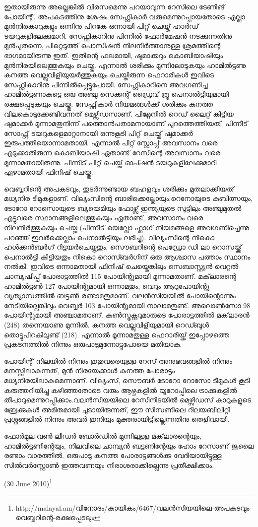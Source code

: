 ഇതായിരുന്നു അല്ലെങ്കില്‍ വിരസമെന്നു പറയാവുന്ന റേസിലെ ടേണിങ് പോയിന്റ്. അപകടത്തിനു ശേഷം സേഫ്റ്റികാര്‍ 
വരുമെന്നുറപ്പായതോടെ എല്ലാ മുന്‍നിരകാറുകളും ഒന്നിനു പിറകേ ഒന്നായി പിറ്റ് ചെയ്ത് ഹാര്‍ഡ് ടയറുകളിലേക്കുമാറി. 
സേഫ്റ്റികാറിനു പിന്നില്‍ ഫോര്‍മേഷന്‍ നടക്കുന്നതിനു മുന്‍പുതന്നെ, പിറ്റെടുത്ത് പൊസിഷന്‍ നിലനിര്‍ത്താനുള്ള 
ശ്രമത്തിന്റെ ഭാഗമായിരുന്നു ഇത്. ഇതിന്റെ ഫലമായി, ഷുമാക്കറും കൊബിയാഷിയും മുന്‍നിരയിലെത്തുകയും ചെയ്തു. 
എന്നാല്‍ ശരിക്കും മുന്നിലോടുകയും ഹാമില്‍ട്ടണു കനത്ത വെല്ലുവിളിയുയര്‍ത്തുകയും ചെയ്തിരുന്ന ഫെറാരികള്‍ ഇവിടെ 
സേഫ്റ്റികാറിനു പിന്നില്‍പ്പെട്ടുപോയി. സേഫ്റ്റികാറിനെ അവഗണിച്ച ഹാമില്‍ട്ടണാകട്ടെ ഒരു അഞ്ചു സെക്കന്റ് ഡ്രൈവ് ത്രൂ 
പെനാല്‍ട്ടിയുമായി രക്ഷപ്പെടുകയും ചെയ്തു. സേഫ്റ്റികാര്‍ നിയമങ്ങള്‍ക്ക് ശരിക്കും കനത്ത വിലകൊടുക്കേണ്ടിവന്നത് 
മെഴ്സിഡസാണ്. പിറ്റ്ലേനില്‍ റെഡ് ലൈറ്റ് കിട്ടിയ ഷുമാക്കര്‍ മൂന്നാമതുനിന്ന് പത്തൊന്‍പതാമനായാണ് പുറത്തെത്തിയത്. 
പിന്നീട് സോഫ്റ്റ് ടയറുകളെമാറ്റാനായി ഒന്നുകൂടി പിറ്റ് ചെയ്ത് ഷുമാക്കര്‍ ഇരുപത്തിയൊന്നാമതായി. എന്നാല്‍ പിറ്റ് 
സ്റ്റോപ്പ് അവസാനം വരെ എടുക്കാതിരുന്ന കൊബിയാഷി ഏതാണ്ട് റേസിന്റെ അവസാനം വരെ മൂന്നാമതായിരുന്നു. 
പിന്നീട് പിറ്റ് ചെയ്ത് ഓപ്ഷന്‍ ടയറുകളിലേക്കുമാറി ഏഴാമതായി ഫിനിഷ് ചെയ്തു.

വെബ്ബറിന്റെ അപകടവും, തുടര്‍ന്നുണ്ടായ ബഹളവും ശരിക്കും മുതലാക്കിയത് മധ്യനിര ടീമുകളാണ്. വില്യംസിന്റെ 
ബാരിക്കെല്ലോയും,റെനോയുടെ കുബിത്സയും, ടോറോ റോസൊയുടെ ബ്യയെമിയും ഫോഴ്സ് ഇന്ത്യയുടെ സുട്ടിലും 
അഞ്ചുമുതല്‍ എട്ടുവരെ സ്ഥാനങ്ങളിലെത്തുകയും ഏതാണ്ട്, അവസാനം വരെ നിലനിര്‍ത്തുകയും ചെയ്തു (പിന്നീട് 
യെല്ലോ ഫ്ലാഗ് നിയമങ്ങളെ അവഗണിച്ചെന്നു പറഞ്ഞ് ഇവര്‍ക്കെല്ലാം പെനാല്‍ട്ടിയും ലഭിച്ചു). വില്യംസിന്റെ നികൊ 
ഹള്‍ക്കന്‍ബര്‍ഗ് റിട്ടയര്‍ചെയ്തതും, സൌബറിന്റെ പെഡ്രോ ഡി ലാ റൊസയ്ക്ക് പെനാല്‍ട്ടി കിട്ടിയതും നികൊ 
റൊസ്ബര്‍ഗിന് ഒരു ആശ്വാസ പത്താം സ്ഥാനം നല്‍കി. ഇവിടെ ഒന്നാമതായി ഫിനിഷ് ചെയ്തെങ്കിലും സെബാസ്റ്റ്യന്‍ 
വെറ്റല്‍ ചാമ്പ്യഷിപ്പ് പോരാട്ടത്തില്‍ 115 പോയിന്റുമായി മൂന്നാമതാണ്. മക്‌ലാരന്റെ ഹാമില്‍ട്ടണ്‍ 127 പോയിന്റുമായി 
ഒന്നാമതും, വെറും ആറുപോയിന്റു വ്യത്യാസത്തില്‍ ബട്ടണ്‍ രണ്ടാമതുമാണ്. വലന്‍സിയയില്‍ പോയിന്റൊന്നും 
നേടിയില്ലെങ്കിലും വെബ്ബര്‍ 103 പോയിന്റുമായി നാലാമതുണ്ട്. അലൊണ്‍സോ 98 പോയിന്റുമായി അഞ്ചാമതാണ്. 
കണ്‍സ്ട്രക്റ്ററുമാരുടെ പോരാട്ടത്തില്‍ മക്‌ലാരന്‍ (248) തന്നെയാണു മുന്നില്‍. കനത്ത വെല്ലുവിളിയുമായി റെഡ്ബുള്‍ 
തൊട്ടുപിറകിലുണ്ട് (218). എന്നാല്‍ മൂന്നാമതുള്ള ഫെറാരിയ്ക്ക് ഇപ്പോഴത്തെ പ്രകടനത്തില്‍ നിന്നും 
ഒരുപാടുമുന്നോട്ടുപോയെ മതിയാകു.

പോയിന്റ് നിലയില്‍ നിന്നും ഇതുവരെയുള്ള റേസ് അനുഭവങ്ങളില്‍ നിന്നും മനസ്സിലാകുന്നത്, മുന്‍ നിരയേക്കാള്‍ കനത്ത 
പോരാട്ടം മധ്യനിരയിലാകുമെന്നാണ്. വില്യംസ്, സൌബര്‍ ടോറോ റോസോ ടീമുകള്‍ കൂടി കരുത്തറിയിച്ചു കഴിഞ്ഞതോടെ
വരും ആഴ്ചകളില്‍ യൂറോപ്പിലെ ട്രാക്കുകളില്‍ തീപാറുമെന്നുറപ്പിക്കാം.വലന്‍സിയയിലെ റേസിനിടയില്‍ മെഴ്സിഡസ് 
കാറുകളുടെ ബ്രേക്കുകള്‍ അമിതമായി ചൂടായിരുന്നത്, ഈ സീസണിലെ റിലയബിലിറ്റി പ്രശ്നങ്ങളില്‍ നിന്നും അവര്‍ ഇനിയും 
മുക്തരായിട്ടില്ലെന്നതിനു തെളിവായി.

ഫോര്‍മുല വണ്‍ ലീഡര്‍ ബോര്‍ഡില്‍ മുന്നിലുള്ള മക്‌ലാരന്റെയും, ഹാമില്‍ട്ടണിന്റേയും, നിലവിലെ ചാമ്പ്യന്‍ ബട്ടണിന്റേയും
ഹോം റേസാണ് ജൂലൈ രണ്ടാം വാരത്തില്‍. ഒരുപാടു കനത്ത പോരാട്ടങ്ങള്‍ക്കു വേദിയായിട്ടുള്ള സില്‍വര്‍സ്റ്റോണ്‍ 
ഇത്തവണയും നിരാശരാക്കില്ലെന്നു പ്രതീക്ഷിക്കാം.

(30 June 2010)\footnote{http://malayal.am/വിനോദം/കായികം/6467/വലന്‍സിയയിലെ-അപകടവും-വെബ്ബറിന്റെ-രക്ഷപ്പെടലും}

\newpage
